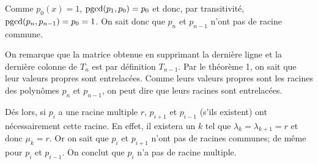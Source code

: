 Comme $p_0(x) = 1$, $\operatorname{pgcd}(p_1,p_0) = p_0$ et donc, par transitivité,
$\operatorname{pgcd}(p_n, p_{n-1}) = p_0 = 1$.
On sait donc que $p_n$ et $p_{n-1}$ n'ont pas de racine commune.


On remarque que la matrice obtenue en supprimant
la dernière ligne et la dernière colonne de $T_n$ est par définition $T_{n-1}$.
Par le théorème 1, on sait que leur valeurs propres sont entrelacées.
Comme leurs valeurs propres sont les racines des polynômes $p_n$ et $p_{n-1}$, on peut dire que leurs racines sont entrelacées.

Dés lors, si $p_i$ a une racine multiple $r$, $p_{i+1}$ et $p_{i-1}$
(s'ils existent) ont nécessairement cette racine.
En effet, il existera un $k$ tel que
$\lambda_k = \lambda_{k+1} = r$ et donc $\mu_{k} = r$.
Or on sait que $p_i$ et $p_{i+1}$ n'ont pas de racines communes;
de même pour $p_i$ et $p_{i-1}$.
On conclut que $p_i$ n'a pas de racine multiple.


